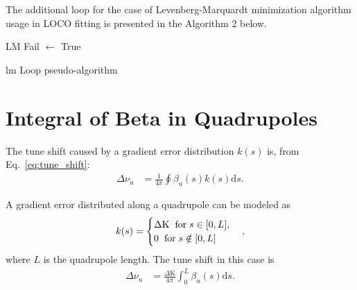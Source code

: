 The additional loop for the case of Levenberg-Marquardt minimization algorithm usage in LOCO fitting is presented in the Algorithm 2 below.
\begin{algorithm}[h!]
\SetAlgoLined
{}
LM Fail $\leftarrow$ True\\
 \caption{\gls{lm} Loop pseudo-algorithm}
 \label{algo:lm_loop}
\end{algorithm}

\chapter{Integral of Beta in Quadrupoles}\label{appendix:beta}
The tune shift caused by a gradient error distribution $k(s)$ is, from Eq.~\eqref{eq:tune_shift}:
\begin{align}
    \Delta\nu_u &= \frac{1}{4\pi} \oint \beta_u(s) k(s) \mathrm{d}s.
\end{align}

A gradient error distributed along a quadrupole can be modeled as
\begin{equation}
    k(s) = 
\begin{cases}
\Delta \mathrm{K} \hspace{0.2cm} \text{for} \hspace{0.1cm} s \in [0, L], \\
0 \hspace{0.2cm} \text{for} \hspace{0.1cm} s \notin [0, L]
\end{cases},
\end{equation}
where $L$ is the quadrupole length. The tune shift in this case is
\begin{align}
    \Delta\nu_u &= \frac{\Delta \mathrm{K}}{4\pi} \int_{0}^{L} \beta_u(s)\mathrm{d}s.
\end{align}

